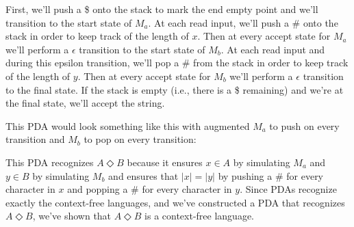 \documentclass{article}
\begin{document}
First, we'll push a \$ onto the stack to mark the end empty point and we'll transition to the start state of $M_a$. At each read input, we'll push a \# onto the stack in order to keep track of the length of $x$. Then at every accept state for $M_a$ we'll perform a $\epsilon$ transition to the start state of $M_b$. At each read input and during this epsilon transition, we'll pop a \# from the stack in order to keep track of the length of $y$. Then at every accept state for $M_b$ we'll perform a $\epsilon$ transition to the final state. If the stack is empty (i.e., there is a \$ remaining) and we're at the final state, we'll accept the string.

This PDA would look something like this with augmented $M_a$ to push on every transition and $M_b$ to pop on every transition:


\begin{center}
    \end{center}

This PDA recognizes $A \Diamond B$ because it ensures $x \in A$ by simulating $M_a$ and $y \in B$ by simulating $M_b$ and ensures that $|x| = |y|$ by pushing a \# for every character in $x$ and popping a \# for every character in $y$. Since PDAs recognize exactly the context-free languages, and we've constructed a PDA that recognizes $A \Diamond B$, we've shown that $A \Diamond B$ is a context-free language.
\end{document}
